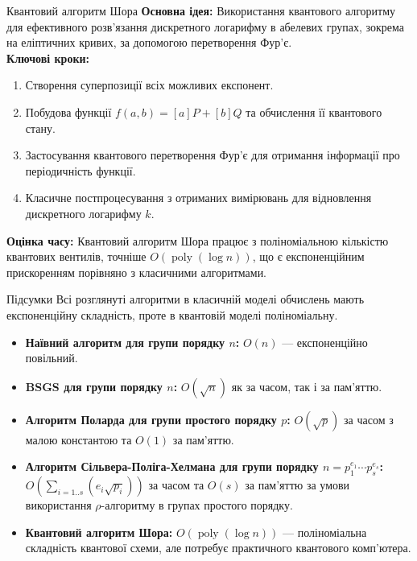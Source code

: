 \documentclass[9pt]{beamer}
\begin{document}
\begin{darkframes}
\begin{frame}{Квантовий алгоритм Шора}
  \textbf{Основна ідея:}  
  Використання квантового алгоритму для ефективного розв’язання дискретного логарифму в абелевих групах, зокрема на еліптичних кривих, за допомогою перетворення Фур’є.\\[2mm]
  \textbf{Ключові кроки:}
  \begin{enumerate}
    \item Створення суперпозиції всіх можливих експонент.
    \item Побудова функції \(f(a,b) = [a]P + [b]Q\) та обчислення її квантового стану.
    \item Застосування квантового перетворення Фур’є для отримання інформації про періодичність функції.
    \item Класичне постпроцесування з отриманих вимірювань для відновлення дискретного логарифму \(k\).
  \end{enumerate}
  \vspace{0.3cm}
  \textbf{Оцінка часу:}  
  Квантовий алгоритм Шора працює з поліноміальною кількістю квантових вентилів, точніше \(O(\operatorname{poly}(\log n))\), що є експоненційним прискоренням порівняно з класичними алгоритмами.
\end{frame}

\begin{frame}{Підсумки}
Всі розглянуті алгоритми в класичній моделі обчислень мають експоненційну складність, проте в квантовій моделі поліноміальну.
  \begin{itemize}
    \item \textbf{Наївний алгоритм для групи порядку $n$:} \(O(n)\) --- експоненційно повільний.
    \item \textbf{BSGS для групи порядку $n$:} \(O(\sqrt{n})\) як за часом, так і за пам'яттю.
    \item \textbf{Алгоритм Поларда для групи простого порядку $p$:} \(O(\sqrt{p})\) за часом з малою константою та \(O(1)\) за пам'яттю.
    \item \textbf{Алгоритм Сільвера-Поліга-Хелмана для групи порядку $n = p_1^{e_1} \cdots p_s^{e_s}$:} $O(\sum_{i=1..s}(e_i\sqrt{p_i}))$ за часом та $O(s)$ за пам'яттю за умови використання $\rho$-алгоритму в групах простого порядку. 
    \item \textbf{Квантовий алгоритм Шора:} \(O(\operatorname{poly}(\log n))\) --- поліноміальна складність квантової схеми, але потребує практичного квантового комп'ютера.
  \end{itemize}
\end{frame}

  \end{darkframes}
\end{document}
